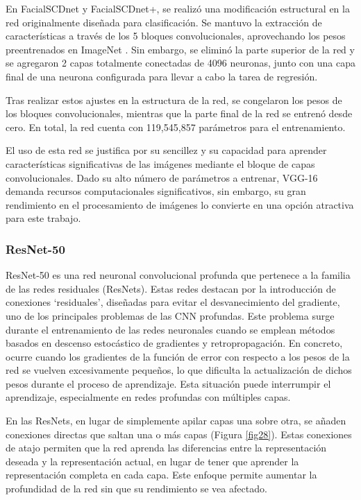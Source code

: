 En FacialSCDnet y FacialSCDnet+, se realizó una modificación estructural en la red originalmente diseñada para clasificación. Se mantuvo la extracción de características a través de los 5 bloques convolucionales, aprovechando los pesos preentrenados en ImageNet \cite{97}. Sin embargo, se eliminó la parte superior de la red y se agregaron 2 capas totalmente conectadas de 4096 neuronas, junto con una capa final de una neurona configurada para llevar a cabo la tarea de regresión.

Tras realizar estos ajustes en la estructura de la red, se congelaron los pesos de los bloques convolucionales, mientras que la parte final de la red se entrenó desde cero. En total, la red cuenta con 119,545,857 parámetros para el entrenamiento.

El uso de esta red se justifica por su sencillez y su capacidad para aprender características significativas de las imágenes mediante el bloque de capas convolucionales. Dado su alto número de parámetros a entrenar, VGG-16 demanda recursos computacionales significativos, sin embargo, su gran rendimiento en el procesamiento de imágenes lo convierte en una opción atractiva para este trabajo.

\subsubsection{ResNet-50}

ResNet-50 es una red neuronal convolucional profunda que pertenece a la familia de las redes residuales \cite{72} (ResNets). Estas redes destacan por la introducción de conexiones \enquote*{residuales}, diseñadas para evitar el desvanecimiento del gradiente, uno de los principales problemas de las CNN profundas.
Este problema surge durante el entrenamiento de las redes neuronales cuando se emplean métodos basados en descenso estocástico de gradientes y retropropagación. En concreto, ocurre cuando los gradientes de la función de error con respecto a los pesos de la red se vuelven excesivamente pequeños, lo que dificulta la actualización de dichos pesos durante el proceso de aprendizaje. Esta situación puede interrumpir el aprendizaje, especialmente en redes profundas con múltiples capas.

En las ResNets, en lugar de simplemente apilar capas una sobre otra, se añaden conexiones directas que saltan una o más capas (Figura \ref{fig28}). Estas conexiones de atajo permiten que la red aprenda las diferencias entre la representación deseada y la representación actual, en lugar de tener que aprender la representación completa en cada capa. Este enfoque permite aumentar la profundidad de la red sin que su rendimiento se vea afectado.

